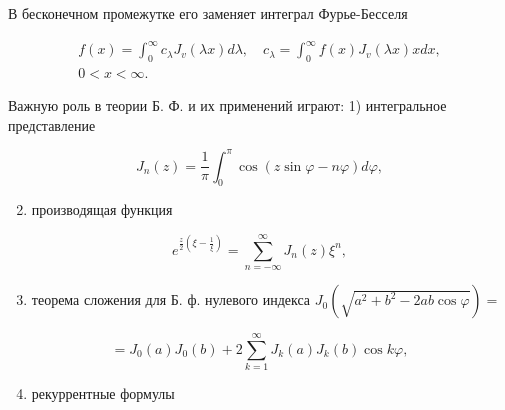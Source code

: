 \documentclass[10pt]{article}
\begin{document}
В бесконечном промежутке его заменяет интеграл Фурье-Бесселя



\[

\begin{gathered}

f(x)=\int_{0}^{\infty} c_{\lambda} J_{v}(\lambda x) d \lambda, \quad c_{\lambda}=\int_{0}^{\infty} f(x) J_{v}(\lambda x) x d x, \\

0<x<\infty .

\end{gathered}

\]



Важную роль в теории Б. Ф. и их применений играют: 1) интегральное представление



\[

J_{n}(z)=\frac{1}{\pi} \int_{0}^{\pi} \cos (z \sin \varphi-n \varphi) d \varphi,

\]



\begin{enumerate}

  \setcounter{enumi}{1}

  \item производящая функция

\end{enumerate}



\[

e^{\frac{z}{2}\left(\xi-\frac{1}{\xi}\right)}=\sum_{n=-\infty}^{\infty} J_{n}(z) \xi^{n},

\]



\begin{enumerate}

  \setcounter{enumi}{2}

  \item теорема сложения для Б. ф. нулевого индекса $J_{0}\left(\sqrt{a^{2}+b^{2}-2 a b \cos \varphi}\right)=$

\end{enumerate}



\[

=J_{0}(a) J_{0}(b)+2 \sum_{k=1}^{\infty} J_{k}(a) J_{k}(b) \cos k \varphi,

\]



\begin{enumerate}

  \setcounter{enumi}{3}

  \item рекуррентные формулы

\end{enumerate}
\end{document}
